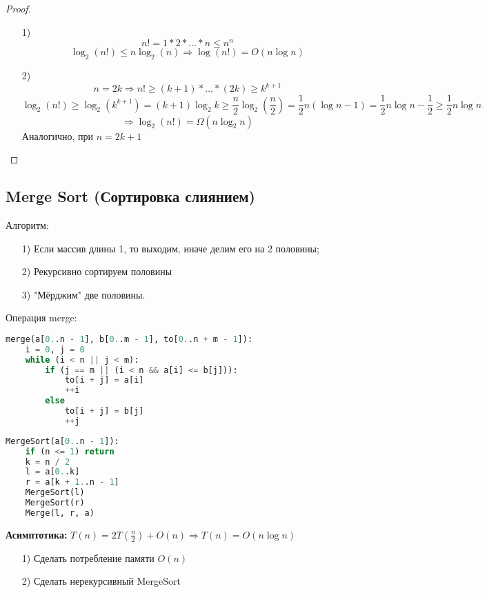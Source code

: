 \begin{proof}
\begin{enumerate}
    \item [1) ]
        \[
            n! = 1 * 2 * \ldots * n \leq n^{n}
        \]
         \[
         \log_2(n!) \leq n\log_2(n) \Rightarrow \log(n!) = O(n\log n)
         \]    
     \item [2) ] \[
     n = 2k \Rightarrow n! \geq (k + 1) * \ldots * (2k) \geq k^{k + 1}
     \] 
     \[
     \log_2(n!) \geq \log_2(k^{k + 1}) = (k + 1)\log_2 k \geq \frac{n}{2} \log_2 (\frac{n}{2}) = \frac{1}{2}n (\log n - 1) = \frac{1}{2}n \log n - \frac{1}{2} \geq \frac{1}{2} n \log n
     \] 
     \[
     \Rightarrow \log_2(n!) = \Omega(n \log_2 n)
     \] 
     Аналогично, при $n = 2k + 1$
\end{enumerate}
\end{proof}

\subsection{Merge Sort (Сортировка слиянием)}
Алгоритм:
\begin{enumerate}
    \item [1) ] Если массив длины 1, то выходим, иначе делим его на 2 половины;
    \item [2) ] Рекурсивно сортируем половины
    \item [3) ] "Мёрджим" две половины.
\end{enumerate}
Операция merge:
\lstset{style=mystyle}
\begin{lstlisting}[language=Python, caption=Merge]
merge(a[0..n - 1], b[0..m - 1], to[0..n + m - 1]):
    i = 0, j = 0
    while (i < n || j < m):
        if (j == m || (i < n && a[i] <= b[j])):
            to[i + j] = a[i]
            ++i
        else
            to[i + j] = b[j]
            ++j
\end{lstlisting}
\lstset{style=mystyle}
\begin{lstlisting}[language=Python, caption=MergeSort]
MergeSort(a[0..n - 1]):
    if (n <= 1) return
    k = n / 2
    l = a[0..k]
    r = a[k + 1..n - 1]
    MergeSort(l)
    MergeSort(r)
    Merge(l, r, a)
\end{lstlisting}
\textbf{Асимптотика:} $T(n) = 2T(\frac{n}{2}) + O(n) \Rightarrow T(n) = O(n\log n)$

\begin{task}
    \begin{enumerate}
        \item [1) ] Сделать потребление памяти $O(n)$
        \item [2) ] Сделать нерекурсивный MergeSort
    \end{enumerate}
\end{task}

